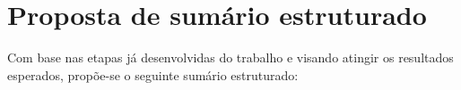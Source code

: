 \section{Proposta de sumário estruturado} \label{SumarioEstruturado}

Com base nas etapas já desenvolvidas do trabalho e visando atingir os resultados esperados, propõe-se o seguinte sumário estruturado:

{

\newcommand{\itemi}[1]{\item \hspace{3em}\textbf{#1}}
\newcommand{\itemii}[1]{\item \hspace{2em}\textbf{#1}}
\newcommand{\itemiii}[1]{\item \hspace{1em}{#1}}

}
